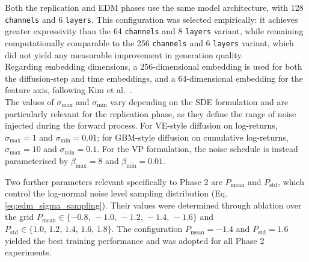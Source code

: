 Both the replication and EDM phases use the same model architecture, with 128
\texttt{channels} and 6 \texttt{layers}. This configuration was selected empirically:
it achieves greater expressivity than the 64 \texttt{channels} and 8 \texttt{layers}
variant, while remaining computationally comparable to the 256 \texttt{channels} and
6 \texttt{layers} variant, which did not yield any measurable improvement in
generation quality.\\

Regarding embedding dimensions, a 256-dimensional embedding is used for both the
diffusion-step and time embeddings, and a 64-dimensional embedding for the feature
axis, following Kim et al.\ \cite{kim2025diffusion}.\\

The values of \(\sigma_{\max}\) and \(\sigma_{\min}\) vary depending on the SDE
formulation and are particularly relevant for the replication phase, as they define
the range of noise injected during the forward process. For VE-style diffusion on
log-returns, \(\sigma_{\max} = 1\) and \(\sigma_{\min} = 0.01\); for GBM-style
diffusion on cumulative log-returns, \(\sigma_{\max} = 10\) and
\(\sigma_{\min} = 0.1\). For the VP formulation, the noise schedule is instead
parameterised by \(\beta_{\max} = 8\) and \(\beta_{\min} = 0.01\).

Two further parameters relevant specifically to Phase 2 are \(P_{\text{mean}}\) and
\(P_{\text{std}}\), which control the log-normal noise level sampling distribution
(Eq.\ref{eq:edm_sigma_sampling}). Their values were determined through ablation over the
grid \(P_{\text{mean}} \in \{-0.8,\,-1.0,\,-1.2,\,-1.4,\,-1.6\}\) and
\(P_{\text{std}} \in \{1.0,\,1.2,\,1.4,\,1.6,\,1.8\}\). The configuration
\(P_{\text{mean}} = -1.4\) and \(P_{\text{std}} = 1.6\) yielded the best training
performance and was adopted for all Phase 2 experiments.